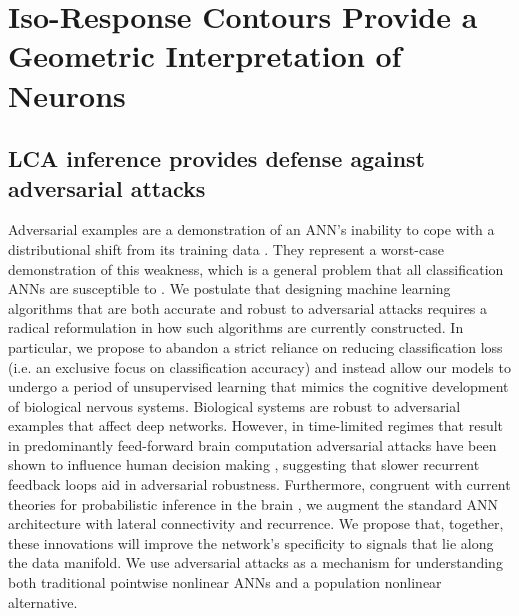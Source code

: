 \chapter{Iso-Response Contours Provide a Geometric Interpretation of Neurons}

\section{LCA inference provides defense against adversarial attacks}\label{sec:ch4_adv_defense}
%    
%

Adversarial examples are a demonstration of an ANN’s inability to cope with a distributional shift from its training data \parencite{ford2019adversarial}. They represent a worst-case demonstration of this weakness, which is a general problem that all classification ANNs are susceptible to \parencite{hendrycks2018benchmarking}. We postulate that designing machine learning algorithms that are both accurate and robust to adversarial attacks requires a radical reformulation in how such algorithms are currently constructed. In particular, we propose to abandon a strict reliance on reducing classification loss (i.e. an exclusive focus on classification accuracy) and instead allow our models to undergo a period of unsupervised learning that mimics the cognitive development of biological nervous systems. Biological systems are robust to adversarial examples that affect deep networks. However, in time-limited regimes that result in predominantly feed-forward brain computation adversarial attacks have been shown to influence human decision making \parencite{elsayed2018adversarial}, suggesting that slower recurrent feedback loops aid in adversarial robustness. Furthermore, congruent with current theories for probabilistic inference in the brain \parencite{lee2003hierarchical}, we augment the standard ANN architecture with lateral connectivity and recurrence. We propose that, together, these innovations will improve the network’s specificity to signals that lie along the data manifold. We use adversarial attacks as a mechanism for understanding both traditional pointwise nonlinear ANNs and a population nonlinear alternative.

